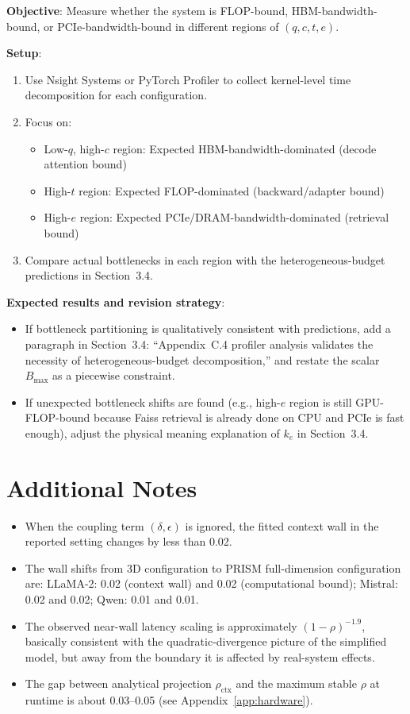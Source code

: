 \documentclass[11pt,a4paper]{article}
\theoremstyle{plain}
\theoremstyle{definition}
\begin{document}
\textbf{Objective}: Measure whether the system is FLOP-bound, HBM-bandwidth-bound, or PCIe-bandwidth-bound in different regions of $(q,c,t,e)$.

\textbf{Setup}:
\begin{enumerate}
    \item Use Nsight Systems or PyTorch Profiler to collect kernel-level time decomposition for each configuration.
    \item Focus on:
    \begin{itemize}
        \item Low-$q$, high-$c$ region: Expected HBM-bandwidth-dominated (decode attention bound)
        \item High-$t$ region: Expected FLOP-dominated (backward/adapter bound)
        \item High-$e$ region: Expected PCIe/DRAM-bandwidth-dominated (retrieval bound)
    \end{itemize}
    \item Compare actual bottlenecks in each region with the heterogeneous-budget predictions in Section~3.4.
\end{enumerate}

\textbf{Expected results and revision strategy}:
\begin{itemize}
    \item If bottleneck partitioning is qualitatively consistent with predictions, add a paragraph in Section~3.4: ``Appendix~C.4 profiler analysis validates the necessity of heterogeneous-budget decomposition,'' and restate the scalar $B_{\max}$ as a piecewise constraint.
    \item If unexpected bottleneck shifts are found (e.g., high-$e$ region is still GPU-FLOP-bound because Faiss retrieval is already done on CPU and PCIe is fast enough), adjust the physical meaning explanation of $k_e$ in Section~3.4.
\end{itemize}

\section{Additional Notes}

\begin{itemize}
    \item When the coupling term $(\delta, \epsilon)$ is ignored, the fitted context wall in the reported setting changes by less than 0.02.
    \item The wall shifts from 3D configuration to PRISM full-dimension configuration are: LLaMA-2: 0.02 (context wall) and 0.02 (computational bound); Mistral: 0.02 and 0.02; Qwen: 0.01 and 0.01.
    \item The observed near-wall latency scaling is approximately $(1-\rho)^{-1.9}$, basically consistent with the quadratic-divergence picture of the simplified model, but away from the boundary it is affected by real-system effects.
    \item The gap between analytical projection $\rho_{\text{ctx}}$ and the maximum stable $\rho$ at runtime is about 0.03--0.05 (see Appendix~\ref{app:hardware}).
\end{itemize}
\end{document}
